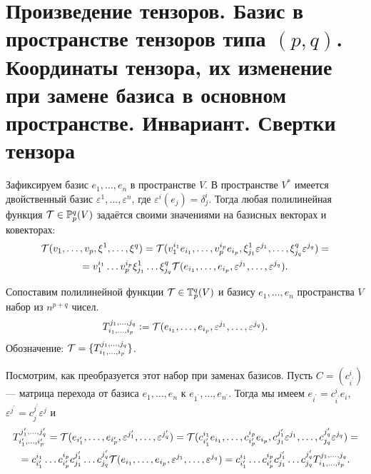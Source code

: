 \section{Произведение тензоров. Базис в пространстве тензоров типа $(p, q)$. Координаты тензора, их изменение при замене базиса в основном пространстве. Инвариант. Свертки тензора}

Зафиксируем базис $e_1, \ldots, e_n$ в пространстве $V$. В пространстве $V^\ast$ имеется двойственный базис $\varepsilon^1, \ldots, \varepsilon^n$, где $\varepsilon^i(e_j) = \delta^i_j$. Тогда любая полилинейная функция $\mathcal{T} \in \mathbb{P}_p^q(V)$ задаётся своими значениями на базисных векторах и ковекторах:
\begin{multline*}
    \mathcal{T}(v_1, \ldots, v_p, \xi^1, \ldots, \xi^q) = \mathcal{T}(v_1^{i_1}e_{i_1}, \ldots, v_p^{i_p}e_{i_p}, \xi^1_{j_1}\varepsilon^{j_1}, \ldots, \xi^q_{j_q}\varepsilon^{j_q}) =\\ = v_1^{i_1} \ldots v_p^{i_p}\xi^1_{j_1}\ldots \xi^q_{j_q}\mathcal{T}(e_{i_1}, \ldots, e_{i_p}, \varepsilon^{j_1}, \ldots, \varepsilon^{j_q}).
\end{multline*}

\begin{definition}
    Сопоставим полилинейной функции $\mathcal{T} \in \mathbb{T}_p^q(V)$ и базису $e_1, \ldots, e_n$ пространства $V$ набор из $n^{p + q}$ чисел.
    \[
        T_{i_1, \ldots, i_p}^{j_1, \ldots, j_q} \vcentcolon = \mathcal{T}(e_{i_1}, \ldots, e_{i_p}, \varepsilon^{j_1}, \ldots, \varepsilon^{j_q}).
    \]
    Обозначение: $\mathcal{T} = \{T_{i_1, \ldots, i_p}^{j_1, \ldots, j_q}\}$.
\end{definition}

Посмотрим, как преобразуется этот набор при заменах базисов. Пусть $C = (c^i_{i^\prime})$ --- матрица перехода от базиса $e_1, \ldots, e_n$ к $e_{1^\prime}, \ldots, e_{n^\prime}$. Тогда мы имеем $e_{i^\prime} = c^i_{i^\prime}e_i$, $\varepsilon^{j^\prime} = c^{j^\prime}_j\varepsilon^j$ и
\begin{multline*}
    T_{i_1^\prime, \ldots, i_p^\prime}^{j_1^\prime, \ldots, j_q^\prime} = \mathcal{T}(e_{i_1^\prime}, \ldots, e_{i_p^\prime}, \varepsilon^{j_1^\prime}, \ldots, \varepsilon^{j_q^\prime}) = \mathcal{T}(c^{i_1}_{i_1^\prime}e_{i_1}, \ldots, c^{i_p}_{i_p^\prime}e_{i_p}, c^{j_1^\prime}_{j_1}\varepsilon^{j_1}, \ldots, c^{j_q^\prime}_{j_q}\varepsilon^{j_q}) =\\ = c^{i_1}_{i_1^\prime}\ldots c^{i_p}_{i_p^\prime}c^{j_1^\prime}_{j_1}\ldots c^{j_q^\prime}_{j_q}\mathcal{T}(e_{i_1}, \ldots, e_{i_p}, \varepsilon^{j_1}, \ldots, \varepsilon^{j_q}) = c^{i_1}_{i_1^\prime}\ldots c^{i_p}_{i_p^\prime}c^{j_1^\prime}_{j_1}\ldots c^{j_q^\prime}_{j_q}T_{i_1, \ldots, i_p}^{j_1, \ldots, j_q}.
\end{multline*}


